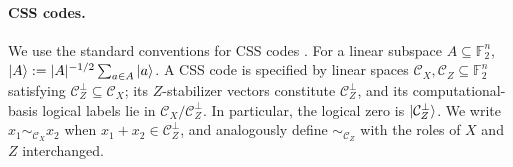 \paragraph{CSS codes.}
We use the standard conventions for CSS codes \cite{Calderbank_1996,Steane_1996}. For a linear subspace $A\subseteq\mathbb F_2^n$, $\ket A:=|A|^{-1/2}\sum_{a\in A}\ket a$. A CSS code is specified by linear spaces $\mathcal C_X,\mathcal C_Z\subseteq\mathbb F_2^n$ satisfying $\mathcal C_Z^\perp\subseteq\mathcal C_X$; its $Z$-stabilizer vectors constitute $\mathcal C_Z^\perp$, and its computational-basis logical labels lie in $\mathcal C_X/\mathcal C_Z^\perp$. In particular, the logical zero is $\ket{\mathcal C_Z^\perp}$. We write $x_1\sim_{\mathcal C_X}x_2$ when $x_1+x_2\in\mathcal C_Z^\perp$, and analogously define $\sim_{\mathcal C_Z}$ with the roles of $X$ and $Z$ interchanged.
